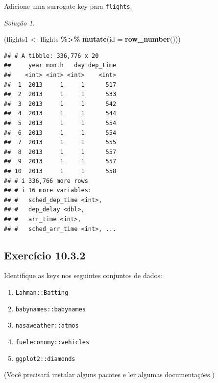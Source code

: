 \documentclass[
]{latex/krantz}
\newenvironment{Shaded}{\begin{snugshade}}{\end{snugshade}}
\newcommand{\AttributeTok}[1]{\textcolor[rgb]{0.13,0.29,0.53}{#1}}
\newcommand{\FunctionTok}[1]{\textcolor[rgb]{0.13,0.29,0.53}{\textbf{#1}}}
\newcommand{\NormalTok}[1]{#1}
\newcommand{\OtherTok}[1]{\textcolor[rgb]{0.56,0.35,0.01}{#1}}
\newcommand{\SpecialCharTok}[1]{\textcolor[rgb]{0.81,0.36,0.00}{\textbf{#1}}}
\providecommand{\tightlist}{%
  \setlength{\itemsep}{0pt}\setlength{\parskip}{0pt}}
\theoremstyle{definition}
\theoremstyle{definition}
\theoremstyle{definition}
\theoremstyle{definition}
\theoremstyle{remark}
\newtheorem*{solution}{Solução}
\begin{document}
Adicione uma surrogate key para \texttt{flights}.

\begin{solution}
\leavevmode

\begin{Shaded}
\begin{Highlighting}[]
\NormalTok{(flights1 }\OtherTok{\textless{}{-}}\NormalTok{ flights }\SpecialCharTok{\%\textgreater{}\%}
  \FunctionTok{mutate}\NormalTok{(}\AttributeTok{id =} \FunctionTok{row\_number}\NormalTok{()))}
\end{Highlighting}
\end{Shaded}

\begin{verbatim}
## # A tibble: 336,776 x 20
##     year month   day dep_time
##    <int> <int> <int>    <int>
##  1  2013     1     1      517
##  2  2013     1     1      533
##  3  2013     1     1      542
##  4  2013     1     1      544
##  5  2013     1     1      554
##  6  2013     1     1      554
##  7  2013     1     1      555
##  8  2013     1     1      557
##  9  2013     1     1      557
## 10  2013     1     1      558
## # i 336,766 more rows
## # i 16 more variables:
## #   sched_dep_time <int>,
## #   dep_delay <dbl>,
## #   arr_time <int>,
## #   sched_arr_time <int>, ...
\end{verbatim}

\end{solution}

\hypertarget{exr10-3-2}{%
\subsection*{Exercício 10.3.2}\label{exr10-3-2}}

Identifique as keys nos seguintes conjuntos de dados:

\begin{enumerate}
\def\labelenumi{\alph{enumi}.}
\tightlist
\item
  \texttt{Lahman::Batting}
\item
  \texttt{babynames::babynames}
\item
  \texttt{nasaweather::atmos}
\item
  \texttt{fueleconomy::vehicles}
\item
  \texttt{ggplot2::diamonds}
\end{enumerate}

(Você precisará instalar alguns pacotes e ler algumas documentações.)
\end{document}
